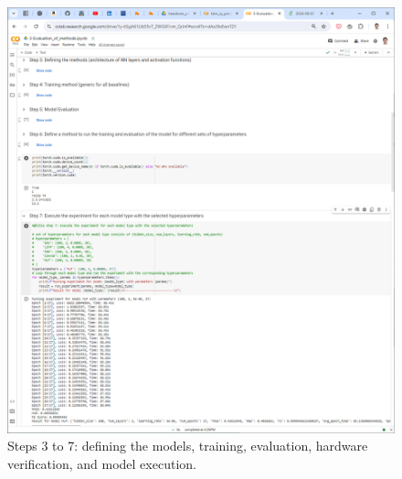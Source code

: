 \documentclass[journal,onecolumn]{IEEEtran}
\begin{document}
{\begin{appendices}
\begin{figure}
    \centering
    \includegraphics[width=1.01\linewidth]{figures/scr-2-colab.png}
    \caption{Steps 3 to 7: defining the models, training, evaluation, hardware verification, and model execution.}
    \label{fig:scr-2-colab}
\end{figure}


\end{appendices}}
\end{document}
